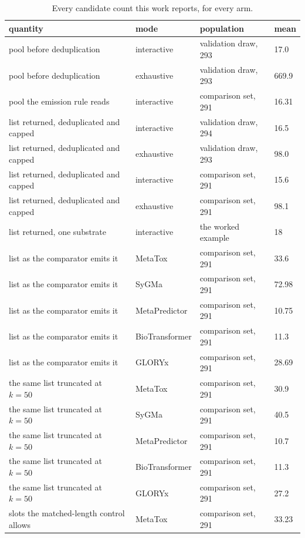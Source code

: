 \begin{table}[h]
\centering\small
\begin{threeparttable}
\caption{Every candidate count this work reports, for every arm.}
\label{tab:si-counts}
\begin{tabular}{llll}
\toprule
quantity & mode & population & mean \\
\midrule
pool before deduplication & interactive & validation draw, 293 & 17.0 \\
pool before deduplication & exhaustive & validation draw, 293 & 669.9 \\
pool the emission rule reads & interactive & comparison set, 291 & 16.31 \\
list returned, deduplicated and capped & interactive & validation draw, 294 & 16.5 \\
list returned, deduplicated and capped & exhaustive & validation draw, 293 & 98.0 \\
list returned, deduplicated and capped & interactive & comparison set, 291 & 15.6 \\
list returned, deduplicated and capped & exhaustive & comparison set, 291 & 98.1 \\
list returned, one substrate & interactive & the worked example & 18 \\
list as the comparator emits it & MetaTox & comparison set, 291 & 33.6 \\
list as the comparator emits it & SyGMa & comparison set, 291 & 72.98 \\
list as the comparator emits it & MetaPredictor & comparison set, 291 & 10.75 \\
list as the comparator emits it & BioTransformer & comparison set, 291 & 11.3 \\
list as the comparator emits it & GLORYx & comparison set, 291 & 28.69 \\
the same list truncated at $k=50$ & MetaTox & comparison set, 291 & 30.9 \\
the same list truncated at $k=50$ & SyGMa & comparison set, 291 & 40.5 \\
the same list truncated at $k=50$ & MetaPredictor & comparison set, 291 & 10.7 \\
the same list truncated at $k=50$ & BioTransformer & comparison set, 291 & 11.3 \\
the same list truncated at $k=50$ & GLORYx & comparison set, 291 & 27.2 \\
slots the matched-length control allows & MetaTox & comparison set, 291 & 33.23 \\

\end{tabular}
\end{threeparttable}
\end{table}
